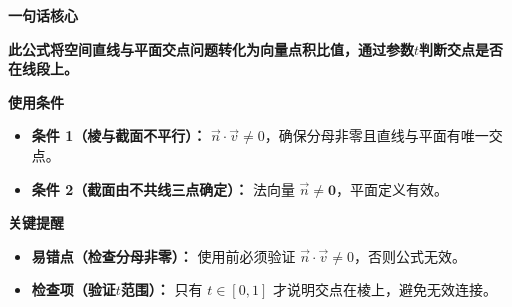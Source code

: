 \begin{summarybox}
	\textbf{\textcolor{CSummary}{一句话核心}}

	\medskip
	\textbf{此公式将空间直线与平面交点问题转化为向量点积比值，通过参数$t$判断交点是否在线段上。}

	\medskip
	\textbf{\textcolor{CSummary}{使用条件}}
	\begin{itemize}[leftmargin=*, itemsep=0.5em, topsep=0.4em]
		\item \textbf{条件 1（棱与截面不平行）：} $\vec{n}\cdot\vec{v}\neq0$，确保分母非零且直线与平面有唯一交点。
		\item \textbf{条件 2（截面由不共线三点确定）：} 法向量 $\vec{n}\neq\mathbf{0}$，平面定义有效。
	\end{itemize}

	\medskip
	\textbf{\textcolor{CSummary}{关键提醒}}
	\begin{itemize}[leftmargin=*, itemsep=0.5em, topsep=0.4em]
		\item \textbf{易错点（检查分母非零）：} 使用前必须验证 $\vec{n}\cdot\vec{v}\neq0$，否则公式无效。
		\item \textbf{检查项（验证$t$范围）：} 只有 $t\in[0,1]$ 才说明交点在棱上，避免无效连接。
	\end{itemize}

\end{summarybox}
